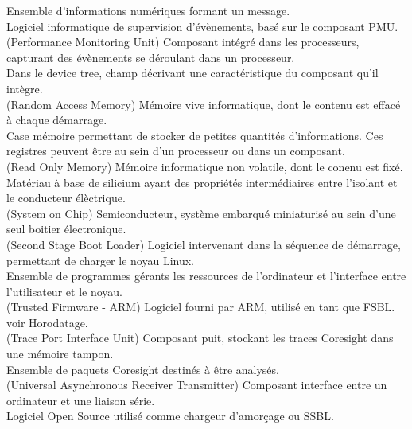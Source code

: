 \noindent
{} Ensemble d'informations numériques formant un message. \\

\noindent
{} Logiciel informatique de supervision d'évènements, basé sur le
composant PMU. \\

\noindent
{} (Performance Monitoring Unit) Composant intégré dans les
processeurs, capturant des évènements se déroulant dans un processeur. \\

\noindent
{} Dans le device tree, champ décrivant une caractéristique du
composant qu'il intègre. \\

\noindent
{} (Random Access Memory) Mémoire vive informatique, dont le contenu
est effacé à chaque démarrage. \\

\noindent
{} Case mémoire permettant de stocker de petites quantités
d'informations. Ces registres peuvent être au sein d'un processeur ou dans un
composant. \\

\noindent
{} (Read Only Memory) Mémoire informatique non volatile, dont le
conenu est fixé. \\

\noindent
{} Matériau à base de silicium ayant des propriétés
intermédiaires entre l'isolant et le conducteur élèctrique. \\

\noindent
{} (System on Chip) Semiconducteur, système embarqué miniaturisé au
sein d'une seul boitier électronique. \\

\noindent
{} (Second Stage Boot Loader) Logiciel intervenant dans la séquence
de démarrage, permettant de charger le noyau Linux. \\

\noindent
{} Ensemble de programmes gérants les ressources
de l'ordinateur et l'interface entre l'utilisateur et le noyau. \\

\noindent
{} (Trusted Firmware - ARM) Logiciel fourni par ARM, utilisé en tant
que FSBL. \\

\noindent
{} voir Horodatage. \\

\noindent
{} (Trace Port Interface Unit) Composant puit, stockant les traces
Coresight dans une mémoire tampon. \\

\noindent
{} Ensemble de paquets Coresight destinés à être analysés. \\

\noindent
{} (Universal Asynchronous Receiver Transmitter) Composant interface
entre un ordinateur et une liaison série. \\

\noindent
{} Logiciel Open Source utilisé comme chargeur d'amorçage ou SSBL.
\\
